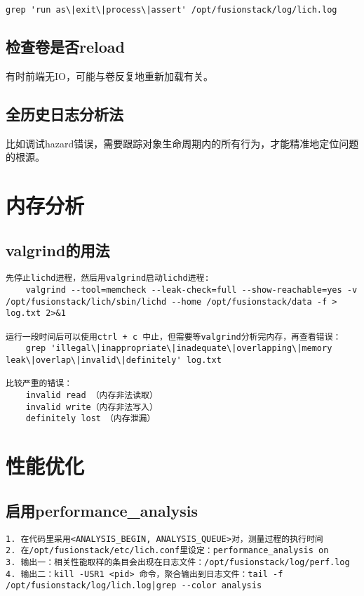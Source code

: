 \begin{lstlisting}
grep 'run as\|exit\|process\|assert' /opt/fusionstack/log/lich.log
\end{lstlisting}

\subsection{检查卷是否reload}

有时前端无IO，可能与卷反复地重新加载有关。

\subsection{全历史日志分析法}

比如调试hazard错误，需要跟踪对象生命周期内的所有行为，才能精准地定位问题的根源。

\section{内存分析}

\subsection{valgrind的用法}

\begin{lstlisting}
先停止lichd进程，然后用valgrind启动lichd进程:
    valgrind --tool=memcheck --leak-check=full --show-reachable=yes -v /opt/fusionstack/lich/sbin/lichd --home /opt/fusionstack/data -f > log.txt 2>&1

运行一段时间后可以使用ctrl + c 中止，但需要等valgrind分析完内存，再查看错误：
    grep 'illegal\|inappropriate\|inadequate\|overlapping\|memory leak\|overlap\|invalid\|definitely' log.txt

比较严重的错误：　　　
    invalid read （内存非法读取）
    invalid write（内存非法写入）
    definitely lost　（内存泄漏）
\end{lstlisting}

\section{性能优化}

\subsection{启用performance\_analysis}

\begin{lstlisting}
1. 在代码里采用<ANALYSIS_BEGIN, ANALYSIS_QUEUE>对，测量过程的执行时间
2. 在/opt/fusionstack/etc/lich.conf里设定：performance_analysis on
3. 输出一：相关性能取样的条目会出现在日志文件：/opt/fusionstack/log/perf.log
4. 输出二：kill -USR1 <pid> 命令，聚合输出到日志文件：tail -f /opt/fusionstack/log/lich.log|grep --color analysis
\end{lstlisting}

